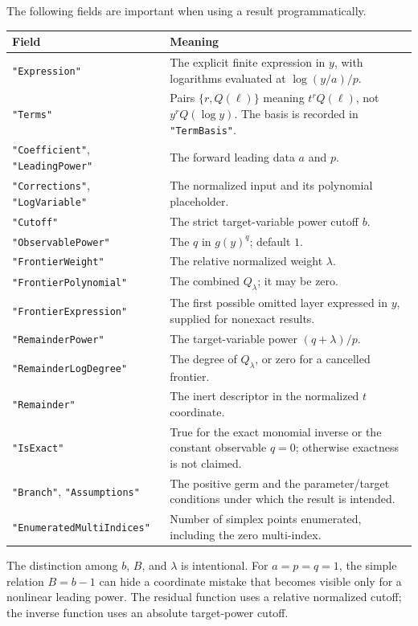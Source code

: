 \documentclass[11pt,a4paper]{article}
\numberwithin{equation}{section}
\theoremstyle{definition}\newtheorem{definition}[theorem]{Definition}
\theoremstyle{remark}\newtheorem{remark}[theorem]{Remark}
\newcommand{\code}[1]{\texttt{#1}}
\begin{document}
The following fields are important when using a result programmatically.
\begin{longtable}{@{}>{\raggedright\arraybackslash}p{}>{\raggedright\arraybackslash}p{}@{}}
\toprule
Field & Meaning \\
\midrule
\endhead
\code{"Expression"} & The explicit finite expression in $y$, with
logarithms evaluated at $\log(y/a)/p$. \\
\code{"Terms"} & Pairs $\{r,Q(\ell)\}$ meaning $t^rQ(\ell)$, not
$y^rQ(\log y)$. The basis is recorded in \code{"TermBasis"}. \\
\code{"Coefficient"}, \code{"LeadingPower"} & The forward leading data
$a$ and $p$. \\
\code{"Corrections"}, \code{"LogVariable"} & The normalized input and
its polynomial placeholder. \\
\code{"Cutoff"} & The strict target-variable power cutoff $b$. \\
\code{"ObservablePower"} & The $q$ in $g(y)^q$; default $1$. \\
\code{"FrontierWeight"} & The relative normalized weight $\lambda$. \\
\code{"FrontierPolynomial"} & The combined $Q_\lambda$; it may be zero. \\
\code{"FrontierExpression"} & The first possible omitted layer expressed
in $y$, supplied for nonexact results. \\
\code{"RemainderPower"} & The target-variable power $(q+\lambda)/p$. \\
\code{"RemainderLogDegree"} & The degree of $Q_\lambda$, or zero for a
cancelled frontier. \\
\code{"Remainder"} & The inert descriptor in the normalized $t$ coordinate. \\
\code{"IsExact"} & True for the exact monomial inverse or the constant
observable $q=0$; otherwise exactness is not claimed. \\
\code{"Branch"}, \code{"Assumptions"} & The positive germ and the
parameter/target conditions under which the result is intended. \\
\code{"EnumeratedMultiIndices"} & Number of simplex points enumerated,
including the zero multi-index. \\
\bottomrule
\end{longtable}

The distinction among $b$, $B$, and $\lambda$ is intentional. For
$a=p=q=1$, the simple relation $B=b-1$ can hide a coordinate mistake that
becomes visible only for a nonlinear leading power. The residual function
uses a relative normalized cutoff; the inverse function uses an absolute
target-power cutoff.
\end{document}
